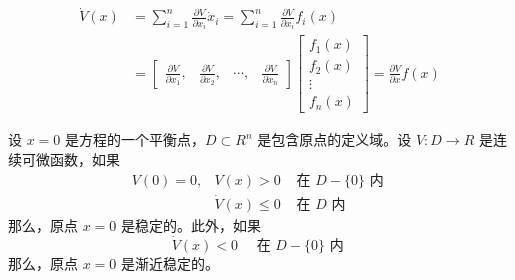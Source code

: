 \begin{equation}
    \begin{aligned}
    \dot{V}(x) & =\sum_{i=1}^n \frac{\partial V}{\partial x_i} \dot{x}_i=\sum_{i=1}^n \frac{\partial V}{\partial x_i} f_i(x) \\
    & =\left[\begin{array}{llll}
    \frac{\partial V}{\partial x_1},& \frac{\partial V}{\partial x_2},& \cdots,& \frac{\partial V}{\partial x_n}
    \end{array}\right]\left[\begin{array}{c}
    f_1(x) \\
    f_2(x) \\
    \vdots \\
    f_n(x)
    \end{array}\right]=\frac{\partial V}{\partial x} f(x)
    \end{aligned}
\end{equation}
\begin{theorem}
    设 $x=0$ 是方程的一个平衡点，$D \subset R^n$ 是包含原点的定义域。设 $V: D \rightarrow R$ 是连续可微函数，如果
    \begin{equation}
        \begin{array}{lll}
        V(0)=0,& V(x)>0 & \text { 在 } D-\{0\} \text { 内 } \\
        & \dot{V}(x) \leqslant 0 & \text { 在 } D \text { 内 }
        \end{array}
    \end{equation}
    那么，原点 $x=0$ 是稳定的。此外，如果
    \begin{equation}
        \dot{V}(x)<0 \quad \text { 在 } D-\{0\} \text { 内 }
    \end{equation}
    那么，原点 $x=0$ 是渐近稳定的。
\end{theorem}
